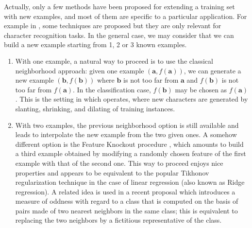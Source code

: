 Actually, only a few methods have been proposed for extending a training set with
new examples, and most of them are specific to a particular application. For
example in \cite{CanPerArlLlo06}, some techniques are proposed but they are
only relevant for character recognition tasks. In the general case, we may
consider that we can build a new example starting from 1, 2 or 3 known
examples.
\begin{enumerate}
\item With one example, a natural way to proceed is to use the classical
  neighborhood approach: given one  example $(\mathbf{a},f(\mathbf{a}))$, we
    can generate a new example $(\mathbf{b},f(\mathbf{b}))$ where  $\mathbf{b}$
    is not too far from $\mathbf{a}$ and $f(\mathbf{b})$ is not too far from
    $f(\mathbf{a})$. In the classification case, $f(\mathbf{b})$ may be chosen
    as $f(\mathbf{a})$. This is the setting in which \cite{CanPerArlLlo06}
    operates, where new characters are generated by slanting, shrinking, and
    dilating of training instances.
\item With two examples, the previous neighborhood option is still available
  and leads to interpolate the new example from the two given ones.  A somehow
    different option is the Feature Knockout procedure \cite{WolMar04}, which
    amounts to build a third example obtained by modifying a randomly chosen
    feature of the first example with that of the second one.  This way to
    proceed enjoys nice properties and appears to be equivalent to the popular
    Tikhonov regularization  technique in the case of linear regression (also
    known  as Ridge regression).  A
    related idea is used in a recent proposal \cite{BouPraRicECAI16} which
    introduces a measure of oddness with regard to a class that is computed on the
    basis of pairs made of two nearest neighbors in the same class; this is
    equivalent to replacing the two neighbors by a fictitious representative of
    the class.


\end{enumerate}
